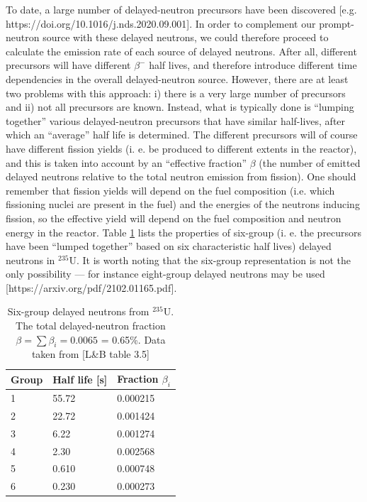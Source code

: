 To date, a large number of delayed-neutron precursors have been discovered [e.g. https://doi.org/10.1016/j.nds.2020.09.001]. In order to complement our prompt-neutron source with these delayed neutrons, we could therefore proceed to calculate the emission rate of each source of delayed neutrons. After all, different precursors will have different $\beta^-$ half lives, and therefore introduce different time dependencies in the overall delayed-neutron source. However, there are at least two problems with this approach: i) there is a very large number of precursors and ii) not all precursors are known. Instead, what is typically done is ``lumping together'' various delayed-neutron precursors that have similar half-lives, after which an ``average'' half life is determined. The different precursors will of course have different fission yields (i. e. be produced to different extents in the reactor), and this is taken into account by an ``effective fraction'' $\beta$ (the number of emitted delayed neutrons relative to the total neutron emission from fission). One should remember that fission yields will depend on the fuel composition (i.e. which fissioning nuclei are present in the fuel) and the energies of the neutrons inducing fission, so the effective yield will depend on the fuel composition and neutron energy in the reactor. Table \ref{tab:delayed_n} lists the properties of six-group (i. e. the precursors have been ``lumped together'' based on six characteristic half lives) delayed neutrons in $^{235}$U. It is worth noting that the six-group representation is not the only possibility --- for instance eight-group delayed neutrons may be used [https://arxiv.org/pdf/2102.01165.pdf].
\begin{table}
        \centering
	\caption{Six-group delayed neutrons from $^{235}$U. The total delayed-neutron fraction $\beta = \sum \beta_i = 0.0065$ = 0.65\%. Data taken from [L\&B table 3.5]}
	\label{tab:delayed_n}
\begin{tabular}{ l l l }
	Group & Half life [s] & Fraction $\beta_i$ \\
  \hline
	1 & 55.72 & 0.000215\\
	2 & 22.72 & 0.001424\\
	3 & 6.22 & 0.001274\\
	4 & 2.30 & 0.002568\\
	5 & 0.610 & 0.000748\\
	6 & 0.230 & 0.000273\\
  \hline
\end{tabular}
\end{table}

